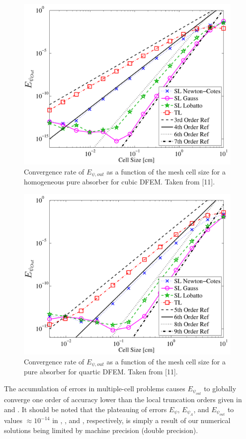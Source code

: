 \begin{figure}[!hbp]
\centering
\includegraphics[width=11cm]{chapter2_constant_xs/Cubic_L2Out_err-eps-converted-to.pdf}
\caption{Convergence rate of $E_{\psi,out}$ as a function of the mesh cell size for a homogeneous pure absorber for cubic DFEM.  Taken from [11].}
\label{fig:multi_L2Out_p3}
\end{figure}
\begin{figure}[!htp]
\centering
\includegraphics[width=11cm]{chapter2_constant_xs/Quartic_L2Out_err-eps-converted-to.pdf}
\caption{Convergence rate of $E_{\psi,out}$ as a function of the mesh cell size for a pure absorber for quartic DFEM.  Taken from [11].}
\label{fig:multi_L2Out_p4}
\end{figure}

\pagebreak
The accumulation of errors in multiple-cell problems causes $E_{\psi_{out}}$ to globally converge one order of accuracy lower than the local truncation orders given in  and . 
It should be noted that the plateauing of errors $E_{\psi}$, $E_{\psi_A}$, and $E_{\psi_{out}}$ to values $\approx 10^{-14}$ 
in , , and , respectively, is simply a result of our numerical solutions being limited by machine precision (double precision).

